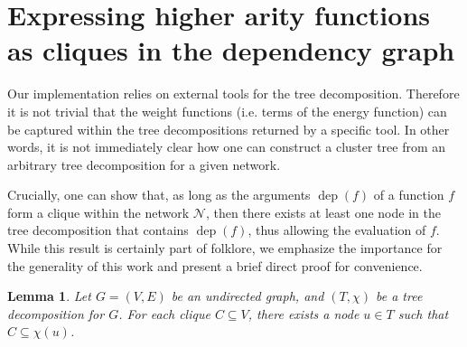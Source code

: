 \documentclass[10pt]{article}
\newtheorem{lemma}[theorem]{Lemma}
\newcommand{\network}{\mathcal{N}}
\newcommand{\dep}{\operatorname{dep}}
\begin{document}
\section{Expressing higher arity functions as cliques in the dependency graph}
\label{appsec:dependency-cliques}

Our implementation relies on external tools for the tree decomposition. Therefore it is not trivial that the weight functions (i.e. terms of the energy function) can be captured within the tree decompositions returned by a specific tool. In other words, it is not immediately clear how one can construct a cluster tree from an arbitrary tree decomposition for a given network.

Crucially, one can show that, as long as the arguments $\dep(f)$ of a function $f$ form a clique within the network $\network$, then there exists at least one node in the tree decomposition that contains $\dep(f)$, thus allowing the evaluation of $f$.
%
While this result is certainly part of folklore, we emphasize the importance for the generality of this work and present a brief direct proof for convenience.

\begin{lemma}\label{lem:cliques}
Let $G=(V,E)$ be an undirected graph, and  $(T,\chi)$ be a tree decomposition for $G$. For each clique $C\subseteq V$, there exists a node $u \in T$ such that $C\subseteq\chi(u)$.
\end{lemma}
\end{document}
